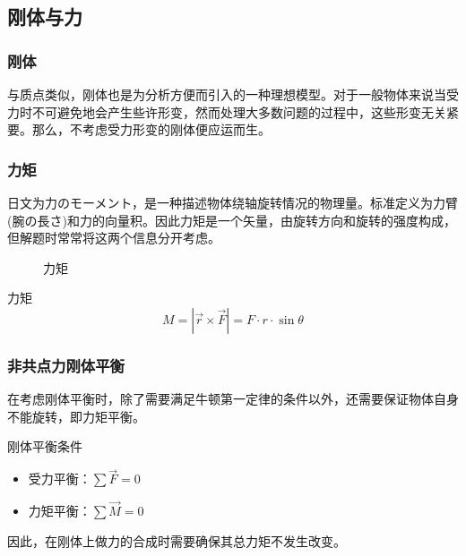 \subsection{刚体与力}

\subsubsection{刚体}

与质点类似，刚体也是为分析方便而引入的一种理想模型。对于一般物体来说当受力时不可避免地会产生些许形变，然而处理大多数问题的过程中，这些形变无关紧要。那么，不考虑受力形变的刚体便应运而生。

\subsubsection{力矩}

日文为力のモーメント，是一种描述物体绕轴旋转情况的物理量。标准定义为力臂(腕の長さ)和力的向量积。因此力矩是一个矢量，由旋转方向和旋转的强度构成，但解题时常常将这两个信息分开考虑。
\begin{figure}[ht!]
    \centering
    \caption{力矩}
\end{figure}
\begin{itembox}[l]{力矩}
    \begin{equation*}
        M=|\vec{r}\times\vec{F}|=F\cdot r\cdot\sin\theta
    \end{equation*}
\end{itembox}

\subsubsection{非共点力刚体平衡}

在考虑刚体平衡时，除了需要满足牛顿第一定律的条件以外，还需要保证物体自身不能旋转，即力矩平衡。
\begin{itembox}[l]{刚体平衡条件}
    \begin{itemize}
        \item 受力平衡：$\sum\vec{F}=0$
        \item 力矩平衡：$\sum\vec{M}=0$
    \end{itemize}
\end{itembox}
因此，在刚体上做力的合成时需要确保其总力矩不发生改变。
